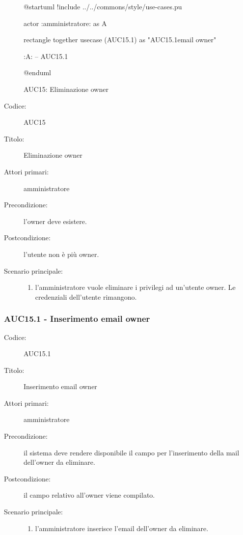 \documentclass[../../../analisi-dei-requisiti.tex]{subfiles}
\begin{document}
\begin{figure}[h!]
  \centering
  \begin{plantuml}
  @startuml
  !include ../../commons/style/use-cases.pu

  actor :amministratore: as A

  rectangle {
    together {
      usecase (AUC15.1) as "AUC15.1\nInserimento email owner"
    }
  }

  :A: -- AUC15.1

  @enduml
  \end{plantuml}
  \caption{AUC15: Eliminazione owner}
  \label{fig:auc15}
\end{figure}

\begin{description}
  \item[Codice:] AUC15
  \item[Titolo:] Eliminazione owner
  \item[Attori primari:] amministratore
  \item[Precondizione:] l'owner deve esistere.
  \item[Postcondizione:] l'utente non è più owner.
  \item[Scenario principale:]
  \begin{enumerate}
    \item l'amministratore vuole eliminare i privilegi ad un'utente owner. Le credenziali dell'utente rimangono.
  \end{enumerate}
\end{description}

\subsubsection{AUC15.1 - Inserimento email owner}%
\label{subs:AUC15.1}
\begin{description}
  \item[Codice:] AUC15.1
  \item[Titolo:] Inserimento email owner
  \item[Attori primari:] amministratore
  \item[Precondizione:] il sistema deve rendere disponibile il campo per l'inserimento della mail dell'owner da eliminare.
  \item[Postcondizione:] il campo relativo all'owner viene compilato.
  \item[Scenario principale:]
  \begin{enumerate}
    \item l'amministratore inserisce l'email dell'owner da eliminare.
  \end{enumerate}
\end{description}
\end{document}
